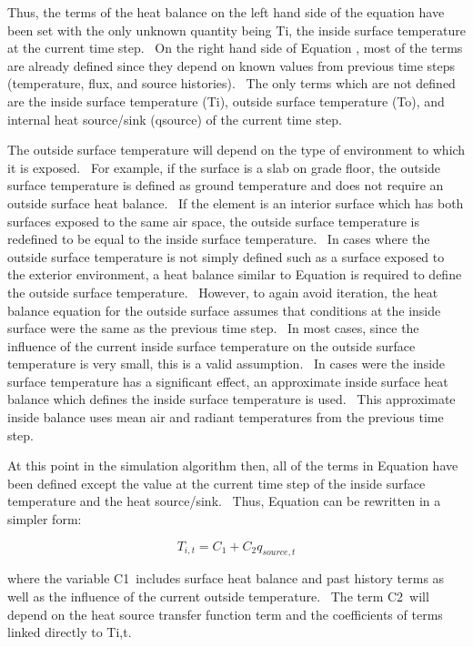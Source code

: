 Thus, the terms of the heat balance on the left hand side of the equation have been set with the only unknown quantity being Ti, the inside surface temperature at the current time step.~ On the right hand side of Equation , most of the terms are already defined since they depend on known values from previous time steps (temperature, flux, and source histories).~ The only terms which are not defined are the inside surface temperature (Ti), outside surface temperature (To), and internal heat source/sink (qsource) of the current time step.

The outside surface temperature will depend on the type of environment to which it is exposed.~ For example, if the surface is a slab on grade floor, the outside surface temperature is defined as ground temperature and does not require an outside surface heat balance.~ If the element is an interior surface which has both surfaces exposed to the same air space, the outside surface temperature is redefined to be equal to the inside surface temperature.~ In cases where the outside surface temperature is not simply defined such as a surface exposed to the exterior environment, a heat balance similar to Equation is required to define the outside surface temperature.~ However, to again avoid iteration, the heat balance equation for the outside surface assumes that conditions at the inside surface were the same as the previous time step.~ In most cases, since the influence of the current inside surface temperature on the outside surface temperature is very small, this is a valid assumption.~ In cases were the inside surface temperature has a significant effect, an approximate inside surface heat balance which defines the inside surface temperature is used.~ This approximate inside balance uses mean air and radiant temperatures from the previous time step.

At this point in the simulation algorithm then, all of the terms in Equation have been defined except the value at the current time step of the inside surface temperature and the heat source/sink.~ Thus, Equation can be rewritten in a simpler form:

\begin{equation}
{T_{i,t}} = {C_1} + {C_2}{q_{source,t}}
\end{equation}

where the variable C1~includes surface heat balance and past history terms as well as the influence of the current outside temperature.~ The term C2~will depend on the heat source transfer function term and the coefficients of terms linked directly to Ti,t.

